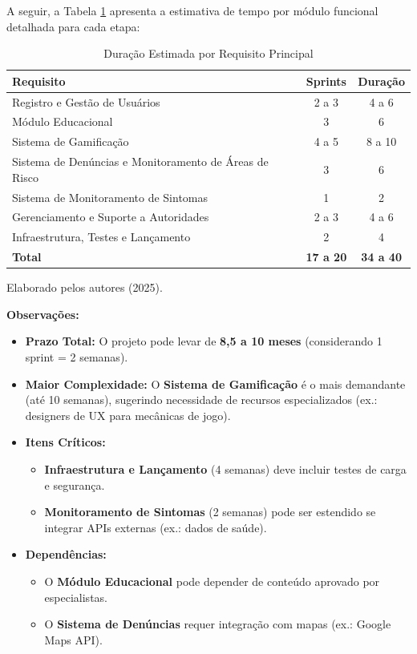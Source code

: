 \documentclass[a4paper, 12pt]{article}
\begin{document}
A seguir, a Tabela \ref{tab:cronograma}  apresenta a estimativa de tempo por módulo funcional detalhada para cada etapa:

\begin{table}[h]
\centering
\caption{Duração Estimada por Requisito Principal}
\label{tab:cronograma}
\begin{tabular}{|l|c|c|}
\hline
\textbf{Requisito} & \textbf{Sprints} & \textbf{Duração} \\
\hline
Registro e Gestão de Usuários & 2 a 3 & 4 a 6 \\
Módulo Educacional & 3  & 6 \\
Sistema de Gamificação & 4 a 5  & 8 a 10 \\
Sistema de Denúncias e Monitoramento de Áreas de Risco & 3  & 6  \\
Sistema de Monitoramento de Sintomas & 1  & 2  \\
Gerenciamento e Suporte a Autoridades & 2 a 3  & 4 a 6  \\
Infraestrutura, Testes e Lançamento & 2  & 4 \\
\hline
\textbf{Total} & \textbf{17 a 20} & \textbf{34 a 40} \\
\hline
\end{tabular}
\smallskip
Elaborado pelos autores (2025).
\end{table}

\noindent \textbf{Observações:}
\begin{itemize}
    \item \textbf{Prazo Total:} O projeto pode levar de \textbf{8,5 a 10 meses} (considerando 1 sprint = 2 semanas).
    \item \textbf{Maior Complexidade:} O \textbf{Sistema de Gamificação} é o mais demandante (até 10 semanas), sugerindo necessidade de recursos especializados (ex.: designers de UX para mecânicas de jogo).
    \item \textbf{Itens Críticos:} 
    \begin{itemize}
        \item \textbf{Infraestrutura e Lançamento} (4 semanas) deve incluir testes de carga e segurança.
        \item \textbf{Monitoramento de Sintomas} (2 semanas) pode ser estendido se integrar APIs externas (ex.: dados de saúde).
    \end{itemize}
    \item \textbf{Dependências:} 
    \begin{itemize}
        \item O \textbf{Módulo Educacional} pode depender de conteúdo aprovado por especialistas.
        \item O \textbf{Sistema de Denúncias} requer integração com mapas (ex.: Google Maps API).
    \end{itemize}
\end{itemize}
\end{document}
